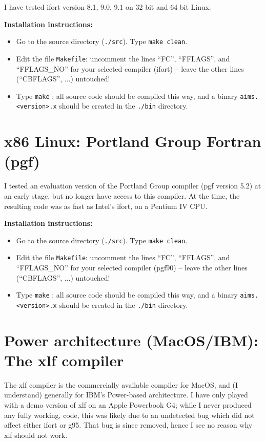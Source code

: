 I have tested ifort version 8.1, 9.0, 9.1 on 32 bit and 64 bit Linux. 

\textbf{Installation instructions:}
\begin{itemize}
  \item Go to the source directory (\texttt{./src}). Type \texttt{make
    clean}. 
  \item Edit the file
    \texttt{Makefile}: uncomment the lines ``FC'', ``FFLAGS'', and
    ``FFLAGS\_NO'' for your selected compiler (ifort) -- leave the other lines
    (``CBFLAGS'', ...) untouched!
  \item Type \texttt{make} ; all source code should be compiled this way, and
    a binary \texttt{aims.<version>.x} should be created in the
    \texttt{./bin} directory.
\end{itemize}

\section{x86 Linux: Portland Group Fortran (pgf)}

I tested an evaluation version of the Portland Group compiler (pgf
version 5.2) at an early stage, but no longer have access to this compiler. At
the time, the resulting code was as fast as Intel's ifort, on a Pentium IV
CPU. 

\textbf{Installation instructions:}
\begin{itemize}
  \item Go to the source directory (\texttt{./src}). Type \texttt{make
    clean}. 
  \item Edit the file
    \texttt{Makefile}: uncomment the lines ``FC'', ``FFLAGS'', and
    ``FFLAGS\_NO'' for your selected compiler (pgf90) -- leave the other lines
    (``CBFLAGS'', ...) untouched!
  \item Type \texttt{make} ; all source code should be compiled this way, and
    a binary \texttt{aims.<version>.x} should be created in the
    \texttt{./bin} directory.
\end{itemize}

\section{Power architecture (MacOS/IBM): The xlf compiler}

The xlf compiler is the commercially available compiler for MacOS, and (I
understand) generally for IBM's Power-based architecture. I have only played
with a demo version of xlf on an Apple Powerbook G4; while I never produced
any fully working, code, this was likely due to an undetected bug which did
not affect either ifort or g95. That bug is since removed, hence I see no
reason why xlf should not work. 

